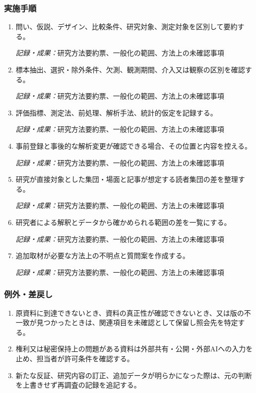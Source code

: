 \documentclass[a4paper,11pt]{article}
\begin{document}
\subsubsection*{実施手順}
\begin{enumerate}[leftmargin=2em,itemsep=0.65em]
\item 問い、仮説、デザイン、比較条件、研究対象、測定対象を区別して要約する。\par\noindent\textit{記録・成果：}研究方法要約票、一般化の範囲、方法上の未確認事項\nobreak\smallskip
\item 標本抽出、選択・除外条件、欠測、観測期間、介入又は観察の区別を確認する。\par\noindent\textit{記録・成果：}研究方法要約票、一般化の範囲、方法上の未確認事項\nobreak\smallskip
\item 評価指標、測定法、前処理、解析手法、統計的仮定を記録する。\par\noindent\textit{記録・成果：}研究方法要約票、一般化の範囲、方法上の未確認事項\nobreak\smallskip
\item 事前登録と事後的な解析変更が確認できる場合、その位置と内容を控える。\par\noindent\textit{記録・成果：}研究方法要約票、一般化の範囲、方法上の未確認事項\nobreak\smallskip
\item 研究が直接対象とした集団・場面と記事が想定する読者集団の差を整理する。\par\noindent\textit{記録・成果：}研究方法要約票、一般化の範囲、方法上の未確認事項\nobreak\smallskip
\item 研究者による解釈とデータから確かめられる範囲の差を一覧にする。\par\noindent\textit{記録・成果：}研究方法要約票、一般化の範囲、方法上の未確認事項\nobreak\smallskip
\item 追加取材が必要な方法上の不明点と質問案を作成する。\par\noindent\textit{記録・成果：}研究方法要約票、一般化の範囲、方法上の未確認事項\nobreak\smallskip
\end{enumerate}
\subsubsection*{例外・差戻し}
\begin{enumerate}[leftmargin=2em,itemsep=0.35em]
\item 原資料に到達できないとき、資料の真正性が確認できないとき、又は版の不一致が見つかったときは、関連項目を未確認として保留し照会先を特定する。
\item 権利又は秘密保持上の問題がある資料は外部共有・公開・外部AIへの入力を止め、担当者が許可条件を確認する。
\item 新たな反証、研究内容の訂正、追加データが明らかになった際は、元の判断を上書きせず再調査の記録を追記する。
\end{enumerate}
\end{document}
